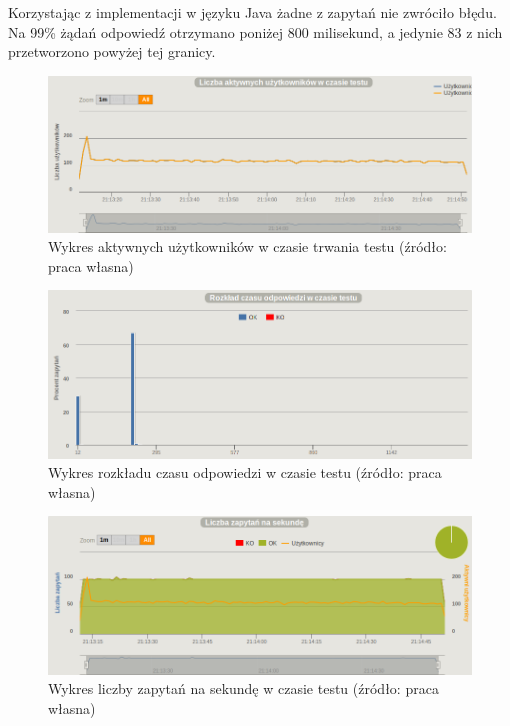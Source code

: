 \documentclass[12pt,twoside]{article}
\begin{document}
Korzystając z implementacji w języku Java żadne z zapytań nie zwróciło
błędu. Na 99\% żądań odpowiedź otrzymano poniżej 800 milisekund, a
jedynie 83 z nich przetworzono powyżej tej granicy.

\begin{figure}[htbp]
\centering
\includegraphics[resolution=150]{test_results/java/matrix/screenshots/active_users.png}
\caption{Wykres aktywnych użytkowników w czasie trwania testu (źródło: praca własna)}
\end{figure}

\begin{figure}[htbp]
\centering
\includegraphics[resolution=150]{test_results/java/matrix/screenshots/distribution.png}
\caption{Wykres rozkładu czasu odpowiedzi w czasie testu (źródło: praca własna)}
\end{figure}

\begin{figure}[htbp]
\centering
\includegraphics[resolution=150]{test_results/java/matrix/screenshots/requests.png}
\caption{Wykres liczby zapytań na sekundę w czasie testu (źródło: praca własna)}
\end{figure}
\end{document}

